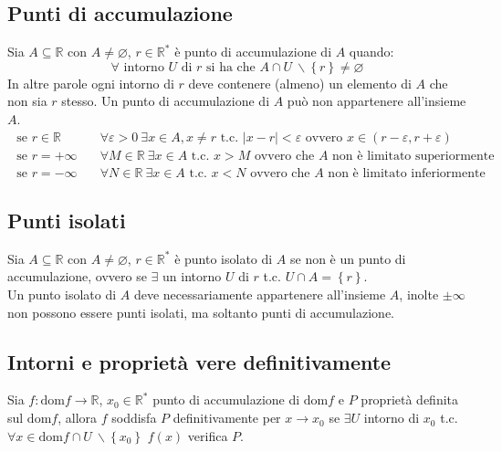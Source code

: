 \documentclass[a4paper]{article}
\newcommand\dom{\text{dom}}
\begin{document}
\subsection{Punti di accumulazione}
Sia \(A \subseteq \mathbb{R}\) con \(A \neq \varnothing\), \(r \in \mathbb{R}^*\) è punto di accumulazione di \(A\) quando:
\[\forall \text{ intorno } U \text{ di } r \text{ si ha che } A \cap U \  \backslash \left\{ r \right\} \neq \varnothing\]
In altre parole ogni intorno di \(r\) deve contenere (almeno) un elemento di \(A\) che non sia \(r\) stesso. Un punto di accumulazione di \(A\) può non appartenere all'insieme \(A\).
\begin{align*}
	\text{ se } r \in \mathbb{R} \quad & \forall \varepsilon > 0 \  \exists x \in A, x \neq r \text{ t.c. } \left| x - r \right| < \varepsilon \text{ ovvero } x \in \left( r - \varepsilon, r + \varepsilon \right) \\
	\text{ se } r = + \infty \quad & \forall M \in \mathbb{R} \  \exists x \in A \text{ t.c. } x > M \text{ ovvero che } A \text{ non è limitato superiormente } \\
	\text{ se } r = - \infty \quad & \forall N \in \mathbb{R} \  \exists x \in A \text{ t.c. } x < N \text{ ovvero che } A \text{ non è limitato inferiormente }
\end{align*}


\subsection{Punti isolati}
Sia \(A \subseteq \mathbb{R}\) con \(A \neq \varnothing\), \(r \in \mathbb{R}^*\) è punto isolato di \(A\) se non è un punto di accumulazione,
ovvero se \(\exists\) un intorno \(U\) di \(r\) t.c. \(U \cap A = \left\{ r \right\}\). \\
Un punto isolato di \(A\) deve necessariamente appartenere all'insieme \(A\), inolte \(\pm \infty\) non possono essere punti isolati, ma soltanto punti di accumulazione.

\newpage


\subsection{Intorni e proprietà vere definitivamente}
Sia \(f: \dom f \to \mathbb{R}\), \(x_0 \in \mathbb{R}^*\) punto di accumulazione di \(\dom f\) e \(P\) proprietà definita sul \(\dom f\),
allora \(f\) soddisfa \(P\) definitivamente per \(x \to x_0\) se \(\exists U\) intorno di \(x_0\) t.c. \(\forall x \in \dom f \cap U \  \backslash \left\{ x_0 \right\}\) \(f(x)\) verifica \(P\).
\end{document}
